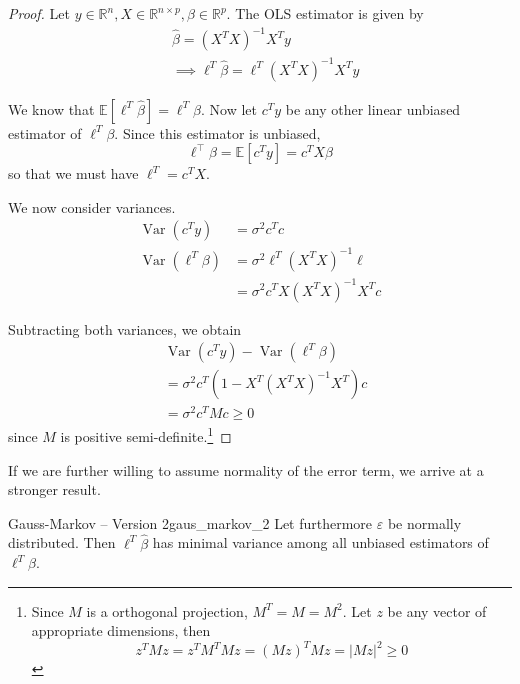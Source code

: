 \documentclass[11pt, %
	oneside, %
	english, %
	onehalfspacing, %
	]{article} %
\numberwithin{equation}{section}
\begin{document}
\begin{proof}
    Let $y \in \mathbb{R}^n, X \in \mathbb{R}^{n \times p}, \beta \in \mathbb{R}^p$. The OLS estimator is given by
    $$
    \begin{aligned}
    &\hat{\beta} = \left( X^T X \right)^{-1} X^T y \\
    &\implies \ell^T \hat{\beta} = \ell^T \left( X^TX \right)^{-1} X^T y
    \end{aligned}
    $$

    We know that $\mathbb{E} \left[ \ell^T \hat{\beta}\right] = \ell^T \beta$. Now let $c^T y$ be any other linear unbiased estimator of $\ell^T \beta$. Since this estimator is unbiased,
    $$
    \ell^\top \beta = \mathbb{E} \left[ c^T y\right]= c^T X \beta
    $$
    so that we must have $\ell^T = c^T X$.

    We now consider variances.
    $$
    \begin{aligned}
    \operatorname{Var} \left( c^T y\right)&= \sigma^2 c^T c \\
    \operatorname{Var} \left( \ell^T \beta\right) &= \sigma^2 \ell^T \left( X^T X \right)^{-1} \ell \\
    &= \sigma^2 c^T X \left( X^T X \right)^{-1} X^T c
    \end{aligned}
    $$

    Subtracting both variances, we obtain
    $$
    \begin{aligned}
    &\operatorname{Var} \left( c^T y\right) - \operatorname{Var} \left( \ell^T \beta\right) \\
    &=
    \sigma^2 c^T \left( 1 - X^T \left( X^T X \right)^{-1}  X^T  \right) c\\
    &= \sigma^2 c^T M c \geq 0
    \end{aligned}
    $$
    since $M$ is positive semi-definite.\footnote{Since $M$ is a orthogonal projection, $M^T = M = M^2$. Let $z$ be any vector of appropriate dimensions, then
    \begin{equation*}
        z^T M z = z^T M^T M z = (M z)^T M z = \left|M z\right|^2 \geq 0
    \end{equation*}
       }
\end{proof}

If we are further willing to assume normality of the error term, we arrive at a stronger result.

\begin{theorem}{Gauss-Markov -- Version 2}{gaus_markov_2}
    Let furthermore $\varepsilon$ be normally distributed. Then $\ell^T \hat{\beta}$ has minimal variance among all unbiased estimators of $\ell^T \beta$.
\end{theorem}
\end{document}
